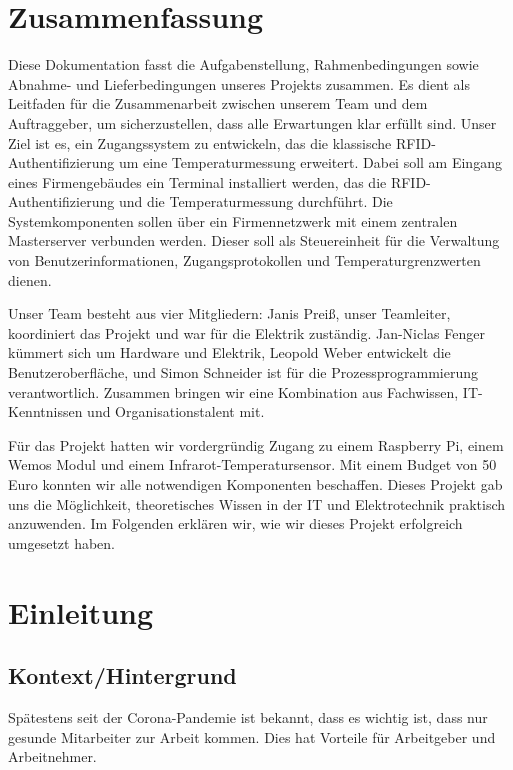
\section{Zusammenfassung}\label{sec:zusammenfassung}

Diese Dokumentation fasst die Aufgabenstellung, Rahmenbedingungen sowie Ab\-nah\-me- und Lieferbedingungen unseres Projekts zusammen. Es dient als Leitfaden für die Zusammenarbeit zwischen unserem Team und dem Auftraggeber, um sicherzustellen, dass alle Erwartungen klar erfüllt sind. Unser Ziel ist es, ein Zugangssystem zu entwickeln, das die klassische RFID-Authentifizierung um eine Temperaturmessung erweitert. Dabei soll am Eingang eines Firmengebäudes ein Terminal installiert werden, das die RFID-Authentifizierung und die Temperaturmessung durchführt. Die Systemkomponenten sollen über ein Firmennetzwerk mit einem zentralen Masterserver verbunden werden. Dieser soll als Steuereinheit für die Verwaltung von Benutzerinformationen, Zugangsprotokollen und Temperaturgrenzwerten dienen.

\vspace{1em}
\noindent Unser Team besteht aus vier Mitgliedern: Janis Preiß, unser Teamleiter, koordiniert das Projekt und war für die Elektrik zuständig. Jan-Niclas Fenger kümmert sich um Hardware und Elektrik, Leopold Weber entwickelt die Benutzeroberfläche, und Simon Schneider ist für die Prozessprogrammierung verantwortlich. Zusammen bringen wir eine Kombination aus Fachwissen, IT-Kenntnissen und Organisationstalent mit.

\vspace{1em}
\noindent Für das Projekt hatten wir vordergründig Zugang zu einem Raspberry Pi, einem Wemos Modul und einem Infrarot-Temperatursensor. Mit einem Budget von 50 Euro konnten wir alle notwendigen Komponenten beschaffen. Dieses Projekt gab uns die Möglichkeit, theoretisches Wissen in der IT und Elektrotechnik praktisch anzuwenden. Im Folgenden erklären wir, wie wir dieses Projekt erfolgreich umgesetzt haben.

\section{Einleitung}\label{sec:einleitung}

\subsection{Kontext/Hintergrund}

Spätestens seit der Corona-Pandemie ist bekannt, dass es wichtig ist, dass nur gesunde Mitarbeiter zur Arbeit kommen. Dies hat Vorteile für Arbeitgeber und Arbeitnehmer. 

